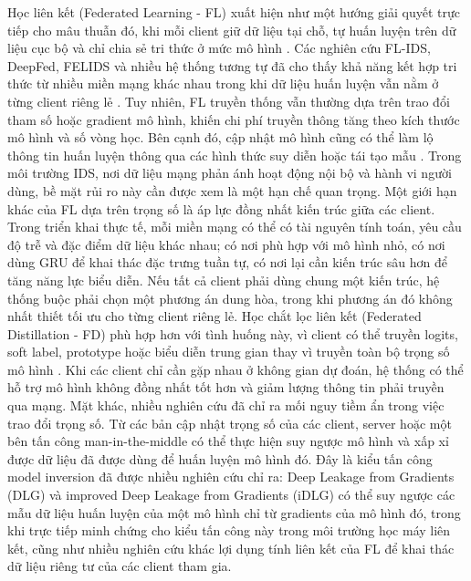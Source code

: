 \bigbreak\noindent
Học liên kết (Federated Learning - FL) xuất hiện như một hướng giải quyết trực tiếp cho mâu thuẫn đó, khi mỗi client giữ dữ liệu tại chỗ, tự huấn luyện trên dữ liệu cục bộ và chỉ chia sẻ tri thức ở mức mô hình \cite{fedavg}. Các nghiên cứu FL-IDS, DeepFed, FELIDS và nhiều hệ thống tương tự đã cho thấy khả năng kết hợp tri thức từ nhiều miền mạng khác nhau trong khi dữ liệu huấn luyện vẫn nằm ở từng client riêng lẻ \cite{li2020deepfed,FRIHA202217felids,bhavsar2024flids,popoola2021flids}. Tuy nhiên, FL truyền thống vẫn thường dựa trên trao đổi tham số hoặc gradient mô hình, khiến chi phí truyền thông tăng theo kích thước mô hình và số vòng học. Bên cạnh đó, cập nhật mô hình cũng có thể làm lộ thông tin huấn luyện thông qua các hình thức suy diễn hoặc tái tạo mẫu \cite{zhu2019dlg,zhao2020idlg,geiping2020inverting}. Trong môi trường IDS, nơi dữ liệu mạng phản ánh hoạt động nội bộ và hành vi người dùng, bề mặt rủi ro này cần được xem là một hạn chế quan trọng.
\bigbreak\noindent
Một giới hạn khác của FL dựa trên trọng số là áp lực đồng nhất kiến trúc giữa các client. Trong triển khai thực tế, mỗi miền mạng có thể có tài nguyên tính toán, yêu cầu độ trễ và đặc điểm dữ liệu khác nhau; có nơi phù hợp với mô hình nhỏ, có nơi dùng GRU để khai thác đặc trưng tuần tự, có nơi lại cần kiến trúc sâu hơn để tăng năng lực biểu diễn. Nếu tất cả client phải dùng chung một kiến trúc, hệ thống buộc phải chọn một phương án dung hòa, trong khi phương án đó không nhất thiết tối ưu cho từng client riêng lẻ. Học chắt lọc liên kết (Federated Distillation - FD) phù hợp hơn với tình huống này, vì client có thể truyền logits, soft label, prototype hoặc biểu diễn trung gian thay vì truyền toàn bộ trọng số mô hình \cite{hinton2015kd,jeong2018federateddistillation,li2019fedmd,li2024fdsurvey}. Khi các client chỉ cần gặp nhau ở không gian dự đoán, hệ thống có thể hỗ trợ mô hình không đồng nhất tốt hơn và giảm lượng thông tin phải truyền qua mạng.
\bigbreak\noindent
Mặt khác, nhiều nghiên cứu đã chỉ ra mối nguy tiềm ẩn trong việc trao đổi trọng số. Từ các bản cập nhật trọng số của các client, server hoặc một bên tấn công man-in-the-middle có thể thực hiện suy ngược mô hình và xấp xỉ được dữ liệu đã được dùng để huấn luyện mô hình đó. Đây là kiểu tấn công model inversion đã được nhiều nghiên cứu chỉ ra: Deep Leakage from Gradients (DLG) \cite{zhu2019dlg} và improved Deep Leakage from Gradients (iDLG) \cite{zhao2020idlg} có thể suy ngược các mẫu dữ liệu huấn luyện của một mô hình chỉ từ gradients của mô hình đó, trong khi \cite{geiping2020inverting} trực tiếp minh chứng cho kiểu tấn công này trong môi trường học máy liên kết, cũng như nhiều nghiên cứu khác \cite{melis2019mia, pyrgelis2017knockknock, ateniese2015inference, ganju2018inference} lợi dụng tính liên kết của FL để khai thác dữ liệu riêng tư của các client tham gia.
